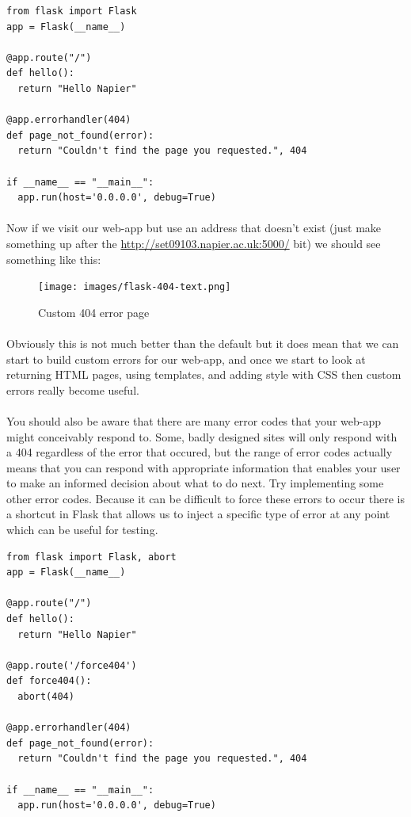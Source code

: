 \documentclass[12pt, a4paper, oneside]{book}
\begin{document}
\begin{lstlisting}
from flask import Flask
app = Flask(__name__)

@app.route("/")
def hello():
  return "Hello Napier"

@app.errorhandler(404)
def page_not_found(error):
  return "Couldn't find the page you requested.", 404

if __name__ == "__main__":
  app.run(host='0.0.0.0', debug=True)
\end{lstlisting}

\paragraph{} Now if we visit our web-app but use an address that doesn't exist (just make something up after the \url{http://set09103.napier.ac.uk:5000/} bit) we should see something like this:

\begin{figure}[H]
\centering
\texttt{[image: images/flask-404-text.png]}
\caption{Custom 404 error page}
\label{fig:flask-404-text}
\end{figure}

\paragraph{} Obviously this is not much better than the default but it does mean that we can start to build custom errors for our web-app, and once we start to look at returning HTML pages, using templates, and adding style with CSS then custom errors really become useful.

\paragraph{} You should also be aware that there are many error codes that your web-app might conceivably respond to. Some, badly designed sites will only respond with a 404 regardless of the error that occured, but the range of error codes actually means that you can respond with appropriate information that enables your user to make an informed decision about what to do next. Try implementing some other error codes. Because it can be difficult to force these errors to occur there is a shortcut in Flask that allows us to inject a specific type of error at any point which can be useful for testing.

\begin{lstlisting}
from flask import Flask, abort
app = Flask(__name__)

@app.route("/")
def hello():
  return "Hello Napier"

@app.route('/force404')
def force404():
  abort(404)

@app.errorhandler(404)
def page_not_found(error):
  return "Couldn't find the page you requested.", 404

if __name__ == "__main__":
  app.run(host='0.0.0.0', debug=True)
\end{lstlisting}
\end{document}
